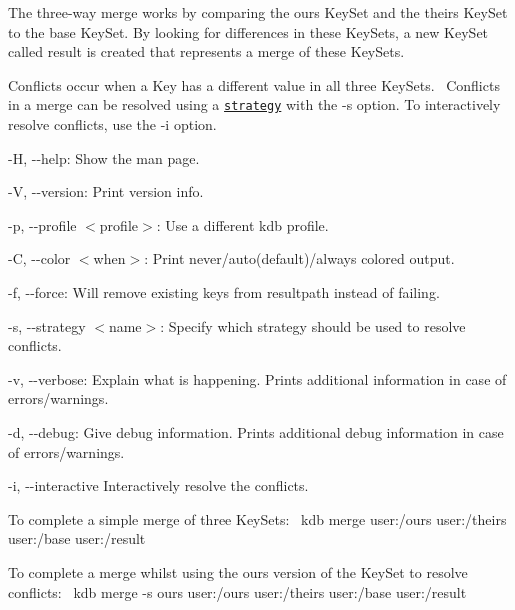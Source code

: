 The three-\/way merge works by comparing the {\ttfamily ours} Key\+Set and the {\ttfamily theirs} Key\+Set to the {\ttfamily base} Key\+Set. By looking for differences in these Key\+Sets, a new Key\+Set called {\ttfamily result} is created that represents a merge of these Key\+Sets.~\newline


Conflicts occur when a Key has a different value in all three Key\+Sets.~\newline
 Conflicts in a merge can be resolved using a \href{#STRATEGIES}{\tt strategy} with the {\ttfamily -\/s} option. To interactively resolve conflicts, use the {\ttfamily -\/i} option.


\begin{DoxyItemize}
\item {\ttfamily -\/H}, {\ttfamily -\/-\/help}\+: Show the man page.
\item {\ttfamily -\/V}, {\ttfamily -\/-\/version}\+: Print version info.
\item {\ttfamily -\/p}, {\ttfamily -\/-\/profile $<$profile$>$}\+: Use a different kdb profile.
\item {\ttfamily -\/C}, {\ttfamily -\/-\/color $<$when$>$}\+: Print never/auto(default)/always colored output.
\item {\ttfamily -\/f}, {\ttfamily -\/-\/force}\+: Will remove existing keys from {\ttfamily resultpath} instead of failing.
\item {\ttfamily -\/s}, {\ttfamily -\/-\/strategy $<$name$>$}\+: Specify which strategy should be used to resolve conflicts.
\item {\ttfamily -\/v}, {\ttfamily -\/-\/verbose}\+: Explain what is happening. Prints additional information in case of errors/warnings.
\item {\ttfamily -\/d}, {\ttfamily -\/-\/debug}\+: Give debug information. Prints additional debug information in case of errors/warnings.
\item {\ttfamily -\/i}, {\ttfamily -\/-\/interactive} Interactively resolve the conflicts.
\end{DoxyItemize}

To complete a simple merge of three Key\+Sets\+:~\newline
 {\ttfamily kdb merge user\+:/ours user\+:/theirs user\+:/base user\+:/result}~\newline


To complete a merge whilst using the {\ttfamily ours} version of the Key\+Set to resolve conflicts\+:~\newline
 {\ttfamily kdb merge -\/s ours user\+:/ours user\+:/theirs user\+:/base user\+:/result}~\newline



